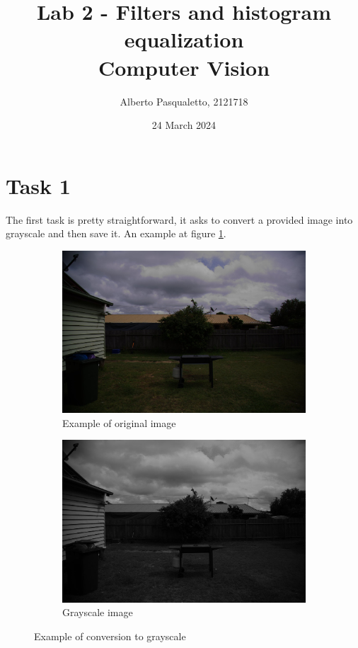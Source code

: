 \documentclass{article}
\title{Lab 2 - Filters and histogram equalization\\
	\large{Computer Vision}}
\author{Alberto Pasqualetto, 2121718}
\date{24 March 2024}
\begin{document}
\maketitle


\section*{Task 1}
The first task is pretty straightforward, it asks to convert a provided image into grayscale and then save it. An example at figure \ref{fig:color_to_grayscale}.
\begin{figure}[H]
	\centering
	\begin{subfigure}{0.4\textwidth}
		\includegraphics[width=\textwidth]{Garden.jpg}
		\caption{Example of original image}
	\end{subfigure}
	\hfill
	\begin{subfigure}{0.4\textwidth}
		\includegraphics[width=\textwidth]{Generated/Garden_grayscale.png}
		\caption{Grayscale image}
	\end{subfigure}
	\caption{Example of conversion to grayscale}
	\label{fig:color_to_grayscale}
\end{figure}
\end{document}
